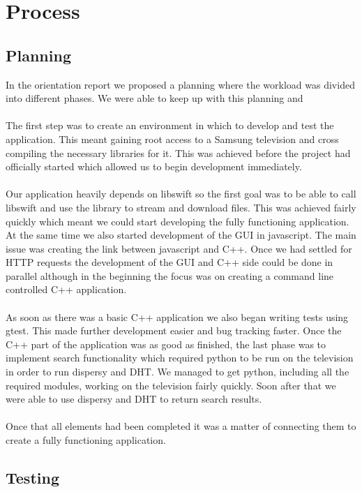 \chapter{Process}

\section{Planning}

In the orientation report we proposed a planning where the workload was divided into different phases. We were able to keep up with this planning and 
\\\\
The first step was to create an environment in which to develop and test the application. This meant gaining root access to a Samsung television and cross compiling the necessary libraries for it. This was achieved before the project had officially started which allowed us to begin development immediately.
\\\\
Our application heavily depends on libswift so the first goal was to be able to call libswift and use the library to stream and download files. This was achieved fairly quickly which meant we could start developing the fully functioning application. At the same time we also started development of the GUI in javascript. The main issue was creating the link between javascript and C++. Once we had settled for HTTP requests the development of the GUI and C++ side could be done in parallel although in the beginning the focus was on creating a command line controlled C++ application.
\\\\
As soon as there was a basic C++ application we also began writing tests using gtest. This made further development easier and bug tracking faster. Once the C++ part of the application was as good as finished, the last phase was to implement search functionality which required python to be run on the television in order to run dispersy and DHT. We managed to get python, including all the required modules, working on the television fairly quickly. Soon after that we were able to use dispersy and DHT to return search results.
\\\\
Once that all elements had been completed it was a matter of connecting them to create a fully functioning application.

\section{Testing}


